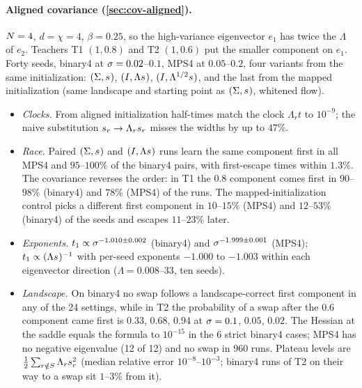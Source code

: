 \paragraph{Aligned covariance (\cref{sec:cov-aligned}).}
\empirical{} $N=4$, $d=\chi=4$, $\beta=0.25$, so the high-variance eigenvector $e_1$ has twice the $\Lambda$ of
$e_2$. Teachers T1 $(1,0.8)$ and T2 $(1,0.6)$ put the smaller component on $e_1$. Forty seeds, binary4 at
$\sigma=0.02$--$0.1$, MPS4 at $0.05$--$0.2$, four variants from the same initialization: $(\Sigma,s_{})$, $(I,\Lambda s_{})$,
$(I,\Lambda^{1/2}s_{})$, and the last from the mapped initialization (same landscape and starting point as
$(\Sigma,s_{})$, whitened flow).
\begin{itemize}
  \item \emph{Clocks.} From aligned initialization half-times match the clock $\Lambda_rt$ to $10^{-9}$; the
    naive substitution $s_{r}\to\Lambda_rs_{r}$ misses the widths by up to $47\%$.
  \item \emph{Race.} Paired $(\Sigma,s_{})$ and $(I,\Lambda s_{})$ runs learn the same component first in all
    MPS4 and $95$--$100\%$ of the binary4 pairs, with first-escape times within $1.3\%$. The covariance
    reverses the order: in T1 the $0.8$ component comes first in $90$--$98\%$ (binary4) and $78\%$ (MPS4) of
    the runs. The mapped-initialization control picks a different first component in $10$--$15\%$ (MPS4)
    and $12$--$53\%$ (binary4) of the seeds and escapes $11$--$23\%$ later.
  \item \emph{Exponents.} $t_{1}\propto\sigma^{-1.010\pm0.002}$ (binary4) and $\sigma^{-1.999\pm0.001}$ (MPS4);
    $t_{1}\propto(\Lambda s_{})^{-1}$ with per-seed exponents $-1.000$ to $-1.003$ within each eigenvector direction
    ($\Lambda=0.008$--$33$, ten seeds).
  \item \emph{Landscape.} On binary4 no swap follows a landscape-correct first component in any of the 24
    settings, while in T2 the probability of a swap after the $0.6$ component came first is $0.33$, $0.68$,
    $0.94$ at $\sigma=0.1$, $0.05$, $0.02$. The Hessian at the saddle equals the formula to $10^{-15}$ in the 6
    strict binary4 cases; MPS4 has no negative eigenvalue (12 of 12) and no swap in 960 runs. Plateau
    levels are $\frac12\sum_{r\notin S}\Lambda_rs_{r}^2$ (median relative error $10^{-8}$--$10^{-3}$; binary4 runs of T2 on
    their way to a swap sit $1$--$3\%$ from it).
\end{itemize}

